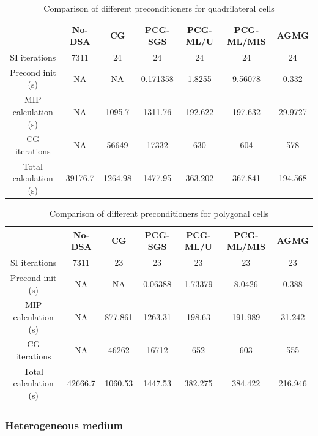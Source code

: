 %
\begin{table}[!htbp]
  \begin{center}
    \caption{Comparison of different preconditioners for quadrilateral cells}
    \begin{tabular}{|c|c|c|c|c|c|c|}
      \hline
      & No-DSA & CG & PCG-SGS & PCG-ML/U & PCG-ML/MIS & AGMG \\
      \hline
      SI iterations   & 7311    & 24      & 24       & 24      & 24      & 24 \\
   Precond init (s)   & NA      & NA      & 0.171358 & 1.8255  & 9.56078 & 0.332 \\
MIP calculation (s)   & NA      & 1095.7  & 1311.76  & 192.622 & 197.632 & 29.9727 \\
      CG iterations   & NA      & 56649   & 17332    & 630     & 604     & 578 \\
Total calculation (s) & 39176.7 & 1264.98 & 1477.95  & 363.202 & 367.841 &
      194.568 \\
      \hline
    \end{tabular}
    \label{comparison_homog_quad}
  \end{center}
\end{table}
%
\begin{table}[!htbp]
  \begin{center}
    \caption{Comparison of different preconditioners for polygonal cells}
    \begin{tabular}{|c|c|c|c|c|c|c|}
      \hline
      & No-DSA & CG & PCG-SGS & PCG-ML/U & PCG-ML/MIS & AGMG \\
      \hline
      SI iterations   & 7311    & 23      & 23      & 23      & 23      & 23 \\
   Precond init (s)   & NA      & NA      & 0.06388 & 1.73379 & 8.0426  & 0.388 \\
MIP calculation (s)   & NA      & 877.861 & 1263.31 & 198.63  & 191.989 &
      31.242 \\
      CG iterations   & NA      & 46262   & 16712   & 652     & 603     & 555 \\
Total calculation (s) & 42666.7 & 1060.53 & 1447.53 & 382.275 & 384.422 &
      216.946 \\
      \hline
    \end{tabular}
    \label{comparison_homog_poly}
  \end{center}
\end{table}

\subsubsection{Heterogeneous medium}

